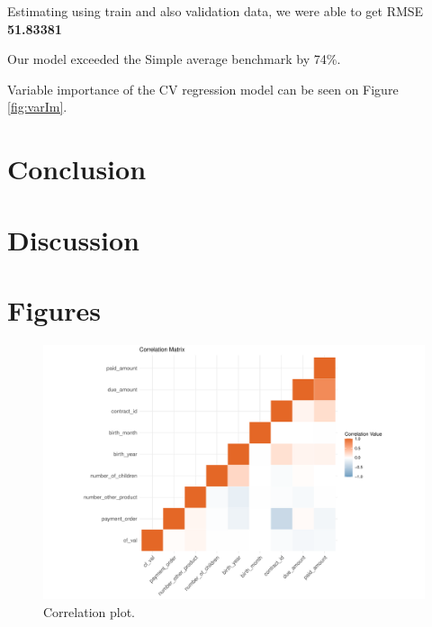 \documentclass[
]{article}
\begin{document}
Estimating using train and also validation data, we were able to get RMSE \textbf{51.83381}

Our model exceeded the Simple average benchmark by 74\%.

Variable importance of the CV regression model can be seen on Figure \ref{fig:varIm}.

\hypertarget{conclusion}{%
\section{Conclusion}\label{conclusion}}

\hypertarget{discussion}{%
\section{Discussion}\label{discussion}}

\hypertarget{figures}{%
\section{Figures}\label{figures}}

\begin{figure}
\centering
\includegraphics{Documentation_Rmarkdown_files/figure-latex/correlogram-1.pdf}
\caption{\label{fig:correlogram}\label{fig:correlogram}Correlation plot.}
\end{figure}
\end{document}
